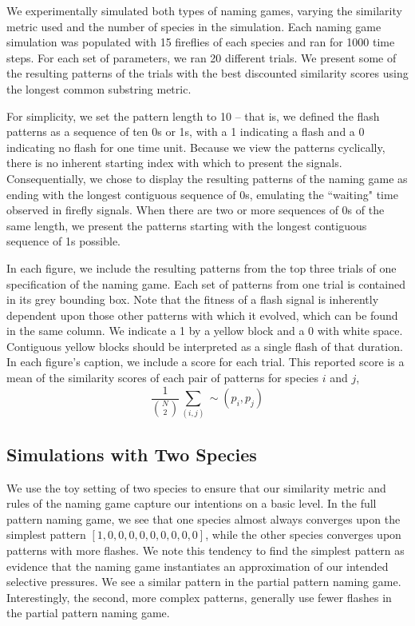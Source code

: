 


We experimentally simulated both types of naming games, varying the similarity metric used and the number of species in the simulation.
Each naming game simulation was populated with 15 fireflies of each species and ran for 1000 time steps. 
For each set of parameters, we ran 20 different trials. We present some of the resulting patterns of the trials with the best discounted similarity scores using the longest common substring metric. 


For simplicity, we set the pattern length to 10 -- that is, we defined the flash patterns as a sequence of ten 0s or 1s, with a 1 indicating a flash and a 0 indicating no flash for one time unit. 
Because we view the patterns cyclically, there is no inherent starting index with which to present the signals. 
Consequentially, we chose to display the resulting patterns of the naming game as ending with the longest contiguous sequence of 0s, emulating the ``waiting" time observed in firefly signals. When there are two or more sequences of 0s of the same length, we present the patterns starting with the longest contiguous sequence of 1s possible. 

In each figure, we include the resulting patterns from the top three trials of one specification of the naming game. 
Each set of patterns from one trial is contained in its grey bounding box.
Note that the fitness of a flash signal is inherently dependent upon those other patterns with which it evolved, which can be found in the same column. 
We indicate a 1 by a yellow block and a 0 with white space. Contiguous yellow blocks should be interpreted as a single flash of that duration. 
In each figure's caption, we include a score for each trial. This reported score is a mean of the similarity scores of each pair of patterns for species $i$ and $j$, \[ \frac{1}{{N \choose 2}} \sum_{(i,j)} \sim (p_i, p_j) \] 

\subsection{Simulations with Two Species}
We use the toy setting of two species to ensure that our similarity metric and rules of the naming game capture our intentions on a basic level.
In the full pattern naming game, we see that one species almost always converges upon the simplest pattern $[1,0,0,0,0,0,0,0,0,0]$, while the other species converges upon patterns with more flashes. We note this tendency to find the simplest pattern as evidence that the naming game instantiates an approximation of our intended selective pressures. 
We see a similar pattern in the partial pattern naming game. Interestingly, the second, more complex patterns, generally use fewer flashes in the partial pattern naming game. 

